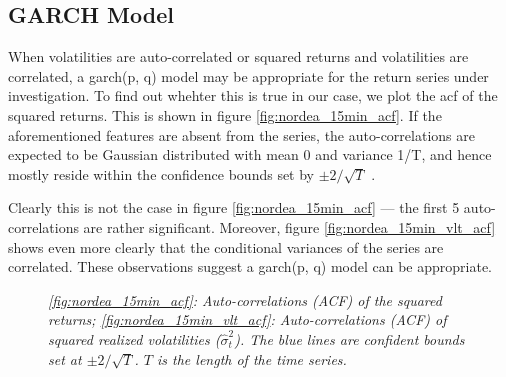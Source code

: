 \subsection{GARCH Model}\label{sec:nordea_15min_garch}
When volatilities are auto-correlated or squared returns and
volatilities are correlated, a \gls{garch}(p, q) model may be
appropriate for the return series under investigation. To find out
whehter this is true in our case, we plot the \gls{acf} of the squared
returns. This is shown in figure \ref{fig:nordea_15min_acf}. If the
aforementioned features are absent from the series, the
auto-correlations are expected to be Gaussian distributed with mean 0
and variance 1/T, and hence mostly reside within the confidence bounds
set by $\pm 2/\sqrt{T}$ \cite{Bollerslev86, Bollerslev87}.

Clearly this is not the case in figure \ref{fig:nordea_15min_acf} ---
the first 5 auto-correlations are rather significant. Moreover, figure
\ref{fig:nordea_15min_vlt_acf} shows even more clearly that the
conditional variances of the series are correlated. These observations
suggest a \gls{garch}(p, q) model can be appropriate.
\begin{figure}[htb!]
  \centering
  \caption{\small \it \ref{fig:nordea_15min_acf}: Auto-correlations
    (ACF) of the squared returns; \ref{fig:nordea_15min_vlt_acf}:
    Auto-correlations (ACF) of squared realized volatilities
    ($\hat{\sigma}^2_t$). The blue lines are confident bounds set at
    $\pm 2/\sqrt{T}$. $T$ is the length of the time series.}
\end{figure}

